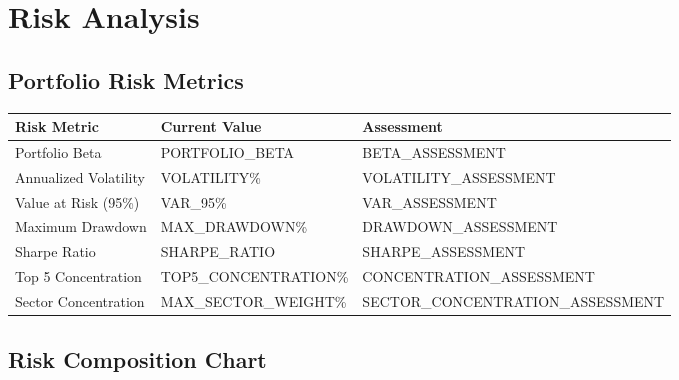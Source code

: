 \documentclass[11pt]{article}
\begin{document}
\section{Risk Analysis}

\subsection{Portfolio Risk Metrics}

\begin{center}
\begin{tabularx}{\textwidth}{|X|X|X|}
\hline
\rowcolor{healthcare!10}
\textbf{Risk Metric} & \textbf{Current Value} & \textbf{Assessment} \\
\hline
Portfolio Beta & {{PORTFOLIO_BETA}} & {{BETA_ASSESSMENT}} \\
Annualized Volatility & {{VOLATILITY}}\% & {{VOLATILITY_ASSESSMENT}} \\
Value at Risk (95\%) & {{VAR_95}}\% & {{VAR_ASSESSMENT}} \\
Maximum Drawdown & {{MAX_DRAWDOWN}}\% & {{DRAWDOWN_ASSESSMENT}} \\
Sharpe Ratio & {{SHARPE_RATIO}} & {{SHARPE_ASSESSMENT}} \\
Top 5 Concentration & {{TOP5_CONCENTRATION}}\% & {{CONCENTRATION_ASSESSMENT}} \\
Sector Concentration & {{MAX_SECTOR_WEIGHT}}\% & {{SECTOR_CONCENTRATION_ASSESSMENT}} \\
\hline
\end{tabularx}
\end{center}

\subsection{Risk Composition Chart}

\begin{center}
\end{center}
\end{document}
